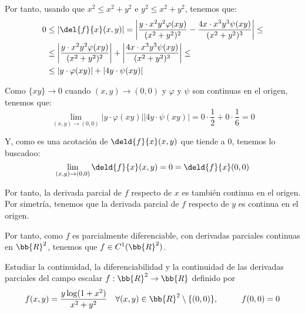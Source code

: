 \begin{ejercicio}
    Por tanto, usando que $x^2\leq x^2+y^2$ e $y^2\leq x^2+y^2$, tenemos que:
    \begin{align*}
        0& \leq \left|\del{f}{x}(x,y)\right|
        = \left|\frac{y\cdot x^2y^2\varphi(xy)}{(x^2+y^2)^2}
        - \frac{4x\cdot x^3y^3\psi(xy)}{(x^2+y^2)^3}\right| \leq \\&\leq
        \left|\frac{y\cdot x^2y^2\varphi(xy)}{(x^2+y^2)^2}\right|
        + \left|\frac{4x\cdot x^3y^3\psi(xy)}{(x^2+y^2)^3}\right| \leq \\&\leq
        \left|y\cdot \varphi(xy)\right| + \left|4y\cdot \psi(xy)\right|
    \end{align*}
    
    Como $\{xy\}\to 0$ cuando $(x,y)\to (0,0)$ y $\varphi$ y $\psi$ son continuas en el origen, tenemos que:
    \begin{equation*}
        \lim_{(x,y)\to (0,0)} \left|y\cdot \varphi(xy)\right|
        \left|4y\cdot \psi(xy)\right|
        = 0\cdot \frac{1}{2} + 0\cdot \frac{1}{6} = 0
    \end{equation*}

    Y, como es una acotación de $\deld{f}{x}(x,y)$ que tiende a $0$, tenemos lo buscadoo:
    $$\lim\limits_{(x,y)\to (0,0)} \deld{f}{x}(x,y) = 0 = \deld{f}{x}(0,0)$$

    Por tanto, la derivada parcial de $f$ respecto de $x$ es también continua en el origen.
    Por simetría, tenemos que la derivada parcial de $f$ respecto de $y$ es continua en el origen.

    Por tanto, como $f$ es parcialmente diferenciable, con derivadas parciales continuas en $\bb{R}^2$, tenemos que $f\in C^1(\bb{R}^2)$.
\end{ejercicio}



\begin{ejercicio}
    Estudiar la continuidad, la diferenciabilidad y la continuidad de las derivadas parciales del campo escalar $f: \bb{R}^2 \to \bb{R}$ definido por
    \begin{equation*}
        f(x,y) = \frac{y\log(1+x^2)}{x^2 + y^2} \quad \forall (x,y) \in \bb{R}^2\setminus\{(0,0)\}, \hspace{1cm}   f(0,0) = 0
    \end{equation*}
\end{ejercicio}